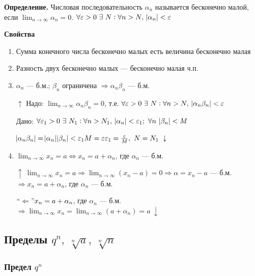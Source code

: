 \documentclass{article}
\begin{document}
    \textbf{Определение.} Числовая последовательность \(\alpha_n\) называется бесконечно малой, если \(\lim_{n \rightarrow \infty}{\alpha_n} = 0\). \(\forall \varepsilon > 0\ \exists\ N : \forall n > N,\ \abs{\alpha_n} < \varepsilon\)
    
    \textbf{Свойства}
    
    \begin{enumerate}
    	\item Сумма конечного числа бесконечно малых есть величина бесконечно малая
        \item Разность двух бесконечно малых --- бесконечно малая ч.п.
        \item \(\alpha_n\) --- б.м.; \(\beta_n\) ограничена \(\Rightarrow \alpha_n \beta_n\) --- б.м.
        
        \(\uparrow\) Надо: \(\lim_{n \rightarrow \infty}{\alpha_n \beta_n} = 0\), т.е. \(\forall \varepsilon > 0\ \exists\ N : \forall n > N,\ \abs{\alpha_n \beta_n} < \varepsilon\)
        
        Дано: \(\forall \varepsilon_1 > 0\ \exists\ N_1 : \forall n > N_1,\ \abs{\alpha_n} < \varepsilon_1;\ \forall n\ \abs{\beta_n} < M\)
        
        \(\abs{\alpha_n \beta_n} = \abs{\alpha_n} \abs{\beta_n} < \varepsilon_1 M = \varepsilon\\ \varepsilon_1 = \frac{\varepsilon}{M},\ N = N_1\ \downarrow\)
        
        \item \(\lim_{n \rightarrow \infty}{x_n} = a \Leftrightarrow x_n = a + \alpha_n\), где \(\alpha_n\) --- б.м.
        
        \(\uparrow\ \lim_{n \rightarrow \infty}{x_n} = a \Rightarrow \lim_{n \rightarrow \infty}{(x_n - a)} = 0 \Rightarrow \alpha = x_n - a\) --- б.м. \(\Rightarrow x_n = a + \alpha_n\), где \(\alpha_n\) --- б.м.
        
        \(``\Leftarrow" x_n = a + \alpha_n\), где \(\alpha_n\) --- б.м. \(\Rightarrow \lim_{n \rightarrow \infty}{x_n} = \lim_{n \rightarrow \infty}{(a + \alpha_n)} = a\ \downarrow\)
    \end{enumerate}
    
    \subsection{Пределы \(q^n,\ \sqrt[n]{a},\ \sqrt[n]{n}\)}
    
    \subsubsection{Предел \(q^n\)}
    
\end{document}
